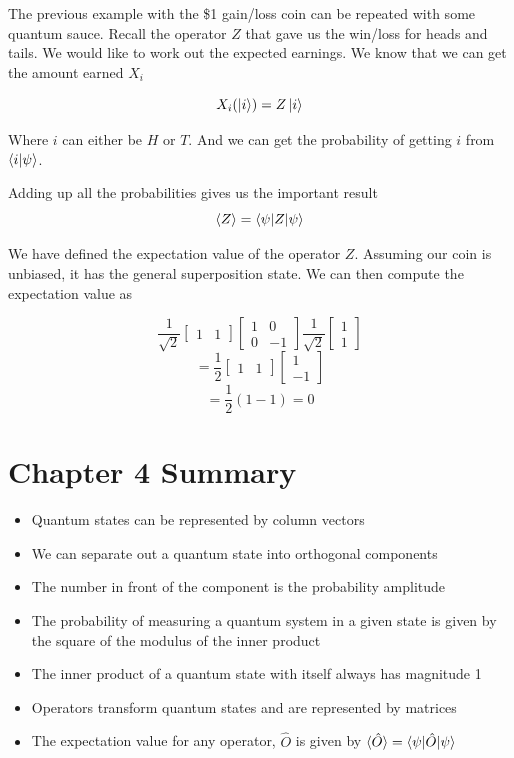 \documentclass{book}
\begin{document}
The previous example with the \$1 gain/loss coin can be repeated with some quantum sauce. Recall the operator $Z$ that gave us the win/loss for heads and tails. We would like to work out the expected earnings. We know that we can get the amount earned $X_i$

$$ X_i (\ket{i}) = Z\ket{i}$$

Where $i$ can either be $H$ or $T$. 
And we can get the probability of getting $i$ from $\braket{i|\psi}$.

Adding up all the probabilities gives us the important result
$$
\braket{Z} = \braket{\psi|Z|\psi}
$$

We have defined the expectation value of the operator $Z$. Assuming our coin is unbiased, it has the general superposition state. We can then compute the expectation value as

$$
\frac{1}{\sqrt{2}} \begin{bmatrix} 1 & 1 \end{bmatrix} \begin{bmatrix} 1 & 0 \\ 0 & -1 \end{bmatrix} \frac{1}{\sqrt{2}} \begin{bmatrix} 1 \\ 1 \end{bmatrix}
$$
$$
= \frac{1}{2}\begin{bmatrix} 1 & 1 \end{bmatrix} \begin{bmatrix} 1 \\ -1 \end{bmatrix}
$$
$$ = \frac{1}{2} ( 1 - 1) = 0 $$ 

\section{Chapter 4 Summary }

\begin{itemize}

    \item Quantum states can be represented by column vectors 
    \item We can separate out a quantum state into orthogonal components 
    \item The number in front of the component is the probability amplitude
    \item The probability of measuring a quantum system in a given state is given by the square of the modulus of the inner product
    \item The inner product of a quantum state with itself always has magnitude 1
    \item Operators transform quantum states and are represented by matrices
    \item The expectation value for any operator, $\hat{O}$  is given by $\braket{\hat{O}} = \braket{\psi|\hat{O}|\psi}$
\end{itemize}
\end{document}
